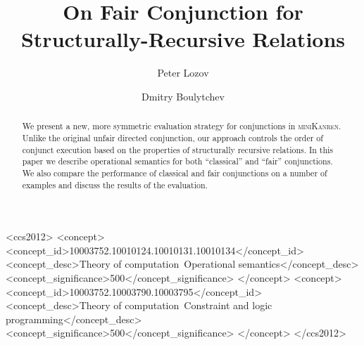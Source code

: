 \documentclass[sigplan,screen]{acmart}
\newcommand{\mk}{\textsc{miniKanren}\xspace}
\begin{document}
\title{On Fair Conjunction for Structurally-Recursive Relations}

\author{Peter Lozov}
\author{Dmitry Boulytchev}
\renewcommand{\shortauthors}{Lozov and Boulytchev}

\begin{abstract}
  We present a new, more symmetric evaluation strategy for conjunctions in \mk. Unlike the original unfair directed conjunction,
  our approach controls the order of conjunct execution based on the properties of structurally recursive relations. In this paper
  we describe operational semantics for both ``classical'' and ``fair'' conjunctions. We also compare the performance of classical
  and fair conjunctions on a number of examples and discuss the results of the evaluation.
\end{abstract}

\begin{CCSXML}
<ccs2012>
<concept>
<concept_id>10003752.10010124.10010131.10010134</concept_id>
<concept_desc>Theory of computation~Operational semantics</concept_desc>
<concept_significance>500</concept_significance>
</concept>
<concept>
<concept_id>10003752.10003790.10003795</concept_id>
<concept_desc>Theory of computation~Constraint and logic programming</concept_desc>
<concept_significance>500</concept_significance>
</concept>
</ccs2012>
\end{CCSXML}
\end{document}
